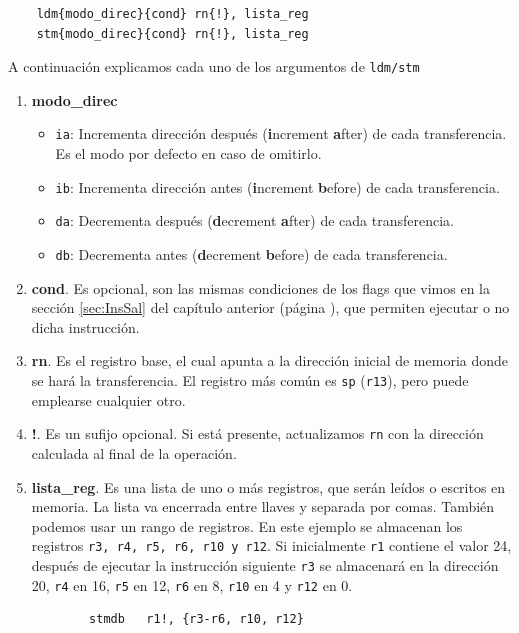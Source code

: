 \begin{lstlisting}
    ldm{modo_direc}{cond} rn{!}, lista_reg
    stm{modo_direc}{cond} rn{!}, lista_reg
\end{lstlisting}

A continuación explicamos cada uno de los argumentos de {\tt ldm/stm}

\begin{enumerate}

\item{\bf modo\_direc}
\begin{itemize}
  \item{\tt ia}: Incrementa dirección después ({\bf i}ncrement {\bf a}fter) de cada transferencia. Es el modo por defecto
                en caso de omitirlo.
  \item{\tt ib}: Incrementa dirección antes ({\bf i}ncrement {\bf b}efore) de cada transferencia.
  \item{\tt da}: Decrementa después ({\bf d}ecrement {\bf a}fter) de cada transferencia.
  \item{\tt db}: Decrementa antes ({\bf d}ecrement {\bf b}efore) de cada transferencia.
\end{itemize}

\item{\bf cond}. Es opcional, son las mismas condiciones de los flags que vimos en la sección
          \ref{sec:InsSal} del capítulo anterior (página \pageref{sec:InsSal}), que permiten
          ejecutar o no dicha instrucción.

\item{\bf rn}. Es el registro base, el cual apunta a la dirección inicial de memoria donde
          se hará la transferencia. El registro más común es {\tt sp} ({\tt r13}), pero puede
          emplearse cualquier otro.

\item{\bf !}. Es un sufijo opcional. Si está presente, actualizamos {\tt rn} con la dirección
          calculada al final de la operación.

\item{\bf lista\_reg}. Es una lista de uno o más registros, que serán leídos o escritos en memoria. La
          lista va encerrada entre llaves y separada por comas. También podemos
          usar un rango de registros. En este ejemplo se almacenan los registros {\tt r3, r4,
          r5, r6, r10 y r12}. Si inicialmente {\tt r1} contiene el valor 24, después de
          ejecutar la instrucción siguiente {\tt r3} se almacenará en la dirección 20,
          {\tt r4} en 16, {\tt r5} en 12, {\tt r6} en 8, {\tt r10} en 4 y {\tt r12} en 0.
\begin{lstlisting}
        stmdb   r1!, {r3-r6, r10, r12}
\end{lstlisting}
\end{enumerate}

